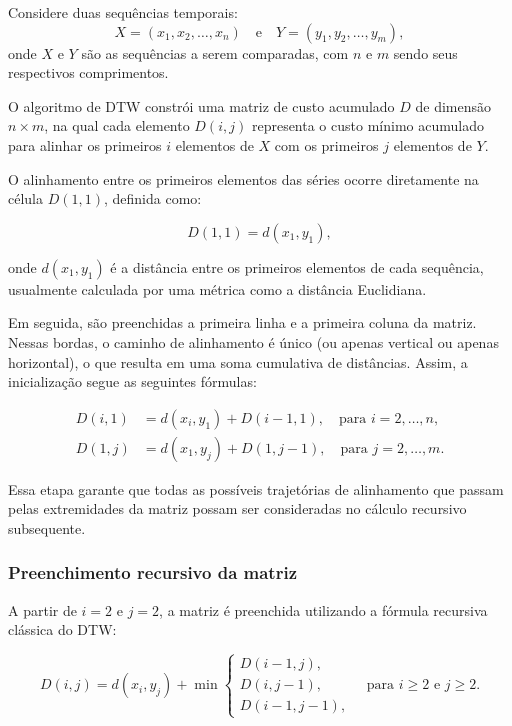 Considere duas sequências temporais:
\begin{equation}
    X = (x_1, x_2, \ldots, x_n) \quad \text{e} \quad Y = (y_1, y_2, \ldots, y_m),
\end{equation}
onde \(X\) e \(Y\) são as sequências a serem comparadas, com \(n\) e \(m\) sendo seus respectivos comprimentos.

O algoritmo de DTW constrói uma matriz de custo acumulado \(D\) de dimensão \(n \times m\), na qual cada elemento \(D(i, j)\) representa o custo mínimo acumulado para alinhar os primeiros \(i\) elementos de \(X\) com os primeiros \(j\) elementos de \(Y\).

O alinhamento entre os primeiros elementos das séries ocorre diretamente na célula \(D(1,1)\), definida como:

\begin{equation}
    D(1,1) = d(x_1, y_1),
\end{equation}

onde \(d(x_1, y_1)\) é a distância entre os primeiros elementos de cada sequência, usualmente calculada por uma métrica como a distância Euclidiana.

Em seguida, são preenchidas a primeira linha e a primeira coluna da matriz. Nessas bordas, o caminho de alinhamento é único (ou apenas vertical ou apenas horizontal), o que resulta em uma soma cumulativa de distâncias. Assim, a inicialização segue as seguintes fórmulas:

\begin{align}
    D(i,1) &= d(x_i, y_1) + D(i-1,1), \quad \text{para } i = 2, \ldots, n, \\
    D(1,j) &= d(x_1, y_j) + D(1,j-1), \quad \text{para } j = 2, \ldots, m.
\end{align}

Essa etapa garante que todas as possíveis trajetórias de alinhamento que passam pelas extremidades da matriz possam ser consideradas no cálculo recursivo subsequente.

\subsubsection*{Preenchimento recursivo da matriz}

A partir de \(i = 2\) e \(j = 2\), a matriz é preenchida utilizando a fórmula recursiva clássica do DTW:

\begin{equation}
    D(i, j) = d(x_i, y_j) + \min \begin{cases}
        D(i-1, j), \\
        D(i, j-1), \\
        D(i-1, j-1),
    \end{cases}
    \quad \text{para } i \geq 2 \text{ e } j \geq 2.
\end{equation}


